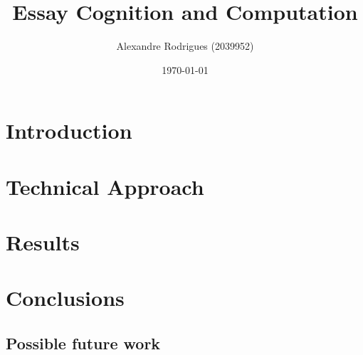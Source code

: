 \documentclass[a4paper, 11pt]{article}
\begin{document}
	
	\title{Essay Cognition and Computation }
	\author{{\small Alexandre Rodrigues (2039952)}}
	\date{\today}
	\maketitle
	
	\section{Introduction}
		
	\section{Technical Approach}
		
	\section{Results}
				
	
	\section{Conclusions}
		
		
		\subsection{Possible future work}
			
\end{document}
